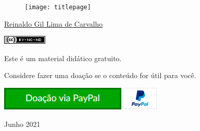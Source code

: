 \thispagestyle{empty}

\begin{center}
  \begin{figure}[H]
    \begin{center}
      \hspace{-1cm}
      \texttt{[image: titlepage]}
  ~\cite{FrontPageIMG}
    \end{center}      
  \end{figure}

  \vskip 2cm

  \hspace{-1cm}
  \begin{minipage}[c]{17cm}
    \begin{center}

{\huge {}\vskip 0.15cm %

{\large \href{http://reinaldoc.wordpress.com}{Reinaldo Gil Lima de Carvalho}} %

{\includegraphics[width=0.1\columnwidth]{imgs/license-CC-BY-NC-ND_header.png}}

\vskip 7cm

{\large {Este é um material didático gratuito.}}

\vskip 0.15cm

{\large {Considere fazer uma doação se o conteúdo for útil para você.}}

\vskip 1cm

\href{https://www.paypal.com/cgi-bin/webscr?cmd=_s-xclick&hosted_button_id=9S2QRNKE3WKM6}{
    {\includegraphics[width=0.4\columnwidth]{imgs/donate.jpg}}
  }
}

    \end{center}
  \end{minipage}

   \vskip 3cm

  {\huge Junho 2021} %
\end{center}
